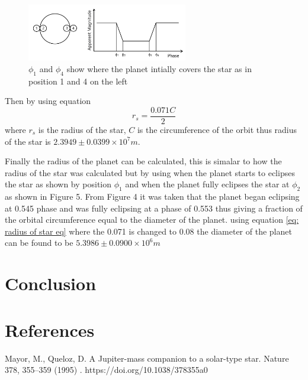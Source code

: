 \documentclass[]{article}
\begin{document}
\begin{figure}[h]
  \includegraphics[width=7cm]{images/planet transit of star.png}
  \caption{$\phi_1 $ and $\phi_4$ show where the planet intially covers
   the star as in position 1 and 4 on the left}
  \label{fig:HD-_init}
  \end{figure}

Then by using equation 
\begin{equation}\label{eq: radius of star eq}
  r_s = \frac{0.071C}{2}
  \end{equation}
where $r_s$ is the radius of the star, $C$ is the circumference of the orbit
thus radius of the star is $2.3949\pm0.0399\times10^7m $.
\par
Finally the radius of the planet can be calculated, this is 
simalar to how the radius of the star was calculated but 
by using when the planet starts to eclipses the star as shown by 
position $\phi_1$ and when the planet fully eclipses the star
at $\phi_2$ as shown in Figure 5.
From Figure 4 it was taken that the planet began eclipsing at 0.545 phase
and was fully eclipsing at a phase of 0.553 thus giving a fraction 
of the orbital circumference equal to the diameter of the planet.
using equation \ref{eq: radius of star eq} where the 0.071 is changed 
to 0.08 the diameter of the planet can be found to be $5.3986\pm 0.0900\times10^6m $
\section*{Conclusion}
\newpage
\onecolumn
\section*{References}

\parskip 0.2cm
\noindent
[2] Mayor, M., Queloz, D. A Jupiter-mass companion to a solar-type star. Nature 378, 355–359 (1995)
. https://doi.org/10.1038/378355a0\parskip 0.2cm
\end{document}
